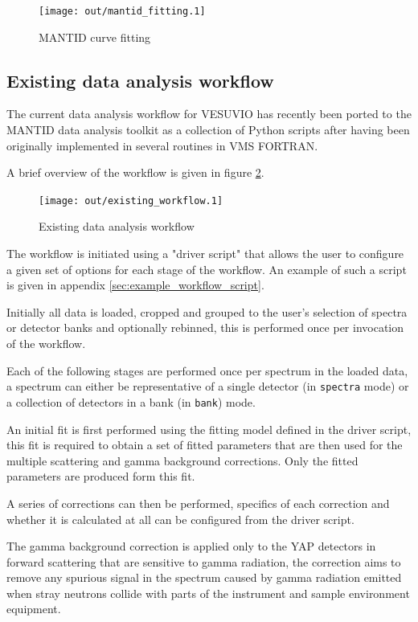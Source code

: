 \documentclass[a4paper]{article}
\begin{document}
\begin{figure}[h!]
  \centering
  \texttt{[image: out/mantid\_fitting.1]}
  \caption{MANTID curve fitting}
  \label{fig:mantid_fitting}
\end{figure}
\FloatBarrier

\subsection{Existing data analysis workflow}
\label{sec:existing_data_analysis_workflow}

The current data analysis workflow for VESUVIO has recently been ported to the
\gls*{MANTID} data analysis toolkit as a collection of Python scripts after
having been originally implemented in several routines in VMS FORTRAN.

A brief overview of the workflow is given in figure \ref{fig:existing_workflow}.

\begin{figure}[h!]
  \centering
  \texttt{[image: out/existing\_workflow.1]}
  \caption{Existing data analysis workflow \cite{Nixon2015}}
  \label{fig:existing_workflow}
\end{figure}
\FloatBarrier

The workflow is initiated using a "driver script" that allows the user to
configure a given set of options for each stage of the workflow. An example of
such a script is given in appendix \ref{sec:example_workflow_script}.

Initially all data is loaded, cropped and grouped to the user's selection of
spectra or detector banks and optionally rebinned, this is performed once per
invocation of the workflow.

Each of the following stages are performed once per spectrum in the loaded data,
a spectrum can either be representative of a single detector (in
\texttt{spectra} mode) or a collection of detectors in a bank (in \texttt{bank})
mode.

An initial fit is first performed using the fitting model defined in the driver
script, this fit is required to obtain a set of fitted parameters that are then
used for the multiple scattering and gamma background corrections. Only the
fitted parameters are produced form this fit.

A series of corrections can then be performed, specifics of each correction and
whether it is calculated at all can be configured from the driver script.

The gamma background correction is applied only to the \gls*{YAP} detectors in
forward scattering that are sensitive to gamma radiation, the correction aims to
remove any spurious signal in the spectrum caused by gamma radiation emitted
when stray neutrons collide with parts of the instrument and sample environment
equipment.
\end{document}
